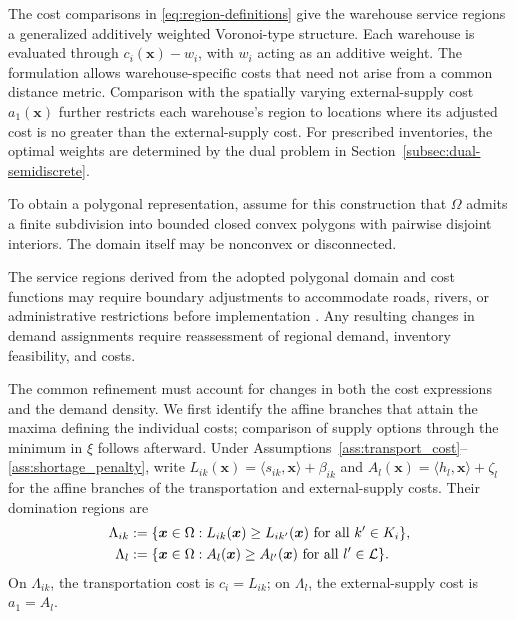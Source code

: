 \documentclass[a4paper,fleqn]{cas-sc}
\theoremstyle{remark}
\theoremstyle{plain}
\begin{document}
The cost comparisons in \eqref{eq:region-definitions} give the warehouse service regions a generalized additively weighted Voronoi-type structure. Each warehouse is evaluated through $c_i(\bm x)-w_i$, with $w_i$ acting as an additive weight. The formulation allows warehouse-specific costs that need not arise from a common distance metric. Comparison with the spatially varying external-supply cost $a_1(\bm x)$ further restricts each warehouse's region to locations where its adjusted cost is no greater than the external-supply cost. For prescribed inventories, the optimal weights are determined by the dual problem in Section~\ref{subsec:dual-semidiscrete}.

To obtain a polygonal representation, assume for this construction that $\Omega$ admits a finite subdivision into bounded closed convex polygons with pairwise disjoint interiors. The domain itself may be nonconvex or disconnected.

The service regions derived from the adopted polygonal domain and cost functions may require boundary adjustments to accommodate roads, rivers, or administrative restrictions before implementation \citep{carlsson2026equitable}. Any resulting changes in demand assignments require reassessment of regional demand, inventory feasibility, and costs.

The common refinement must account for changes in both the cost expressions and the demand density. We first identify the affine branches that attain the maxima defining the individual costs; comparison of supply options through the minimum in $\xi$ follows afterward. Under Assumptions~\ref{ass:transport_cost}--\ref{ass:shortage_penalty}, write $L_{ik}(\bm x)=\langle s_{ik},\bm x\rangle+\beta_{ik}$ and $A_l(\bm x)=\langle h_l,\bm x\rangle+\zeta_l$ for the affine branches of the transportation and external-supply costs. Their domination regions are
\begin{subequations}\label{eq:affine-domination}
\allowdisplaybreaks[0]
\begin{align}
    \Lambda_{ik}&:=\{\bm x\in\Omega:L_{ik}(\bm x)\ge L_{ik'}(\bm x)\text{ for all }k'\in K_i\},\\
    \Lambda_l&:=\{\bm x\in\Omega:A_l(\bm x)\ge A_{l'}(\bm x)\text{ for all }l'\in\mathcal L\}.
\end{align}
\end{subequations}
On $\Lambda_{ik}$, the transportation cost is $c_i=L_{ik}$; on $\Lambda_l$, the external-supply cost is $a_1=A_l$.
\end{document}
